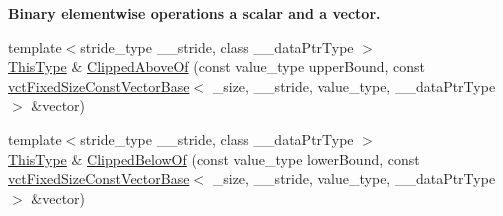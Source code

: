 \begin{Indent}{\bf Binary elementwise operations a scalar and a vector.}
\begin{DoxyCompactItemize}
\item 
{\footnotesize template$<$stride\+\_\+type \+\_\+\+\_\+stride, class \+\_\+\+\_\+data\+Ptr\+Type $>$ }\\\hyperlink{classvct_fixed_size_const_vector_base_a071063bc4fa43112cc287b2dbef53180}{This\+Type} \& \hyperlink{classvct_fixed_size_vector_base_ad2eac3a2f3c6a04df9dfdc92b09833c4}{Clipped\+Above\+Of} (const value\+\_\+type upper\+Bound, const \hyperlink{classvct_fixed_size_const_vector_base}{vct\+Fixed\+Size\+Const\+Vector\+Base}$<$ \+\_\+size, \+\_\+\+\_\+stride, value\+\_\+type, \+\_\+\+\_\+data\+Ptr\+Type $>$ \&vector)
\item 
{\footnotesize template$<$stride\+\_\+type \+\_\+\+\_\+stride, class \+\_\+\+\_\+data\+Ptr\+Type $>$ }\\\hyperlink{classvct_fixed_size_const_vector_base_a071063bc4fa43112cc287b2dbef53180}{This\+Type} \& \hyperlink{classvct_fixed_size_vector_base_ac9f6aefb059c505111998451fa27e2ee}{Clipped\+Below\+Of} (const value\+\_\+type lower\+Bound, const \hyperlink{classvct_fixed_size_const_vector_base}{vct\+Fixed\+Size\+Const\+Vector\+Base}$<$ \+\_\+size, \+\_\+\+\_\+stride, value\+\_\+type, \+\_\+\+\_\+data\+Ptr\+Type $>$ \&vector)
\end{DoxyCompactItemize}
\end{Indent}
